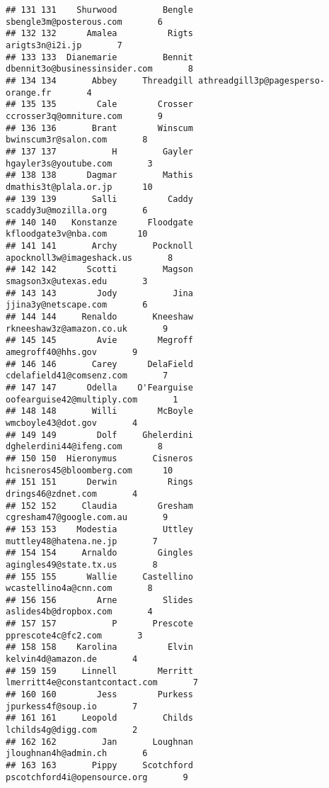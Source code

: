 \documentclass[]{article}
\begin{document}
\begin{verbatim}
## 131 131    Shurwood         Bengle            sbengle3m@posterous.com       6
## 132 132      Amalea          Rigts                    arigts3n@i2i.jp       7
## 133 133  Dianemarie         Bennit      dbennit3o@businessinsider.com       8
## 134 134       Abbey     Threadgill athreadgill3p@pagesperso-orange.fr       4
## 135 135        Cale        Crosser            ccrosser3q@omniture.com       9
## 136 136       Brant        Winscum               bwinscum3r@salon.com       8
## 137 137           H         Gayler              hgayler3s@youtube.com       3
## 138 138      Dagmar         Mathis              dmathis3t@plala.or.jp      10
## 139 139       Salli          Caddy               scaddy3u@mozilla.org       6
## 140 140   Konstanze      Floodgate               kfloodgate3v@nba.com      10
## 141 141       Archy       Pocknoll          apocknoll3w@imageshack.us       8
## 142 142      Scotti         Magson               smagson3x@utexas.edu       3
## 143 143        Jody           Jina               jjina3y@netscape.com       6
## 144 144     Renaldo       Kneeshaw           rkneeshaw3z@amazon.co.uk       9
## 145 145        Avie        Megroff                 amegroff40@hhs.gov       9
## 146 146       Carey      DelaField           cdelafield41@comsenz.com       7
## 147 147      Odella    O'Fearguise         oofearguise42@multiply.com       1
## 148 148       Willi        McBoyle                 wmcboyle43@dot.gov       4
## 149 149        Dolf     Ghelerdini            dghelerdini44@ifeng.com       8
## 150 150  Hieronymus       Cisneros          hcisneros45@bloomberg.com      10
## 151 151      Derwin          Rings                 drings46@zdnet.com       4
## 152 152     Claudia        Gresham           cgresham47@google.com.au       9
## 153 153    Modestia         Uttley             muttley48@hatena.ne.jp       7
## 154 154     Arnaldo        Gingles             agingles49@state.tx.us       8
## 155 155      Wallie     Castellino              wcastellino4a@cnn.com       8
## 156 156        Arne         Slides              aslides4b@dropbox.com       4
## 157 157           P       Prescote                pprescote4c@fc2.com       3
## 158 158    Karolina          Elvin                 kelvin4d@amazon.de       4
## 159 159     Linnell        Merritt     lmerritt4e@constantcontact.com       7
## 160 160        Jess        Purkess                 jpurkess4f@soup.io       7
## 161 161     Leopold         Childs                 lchilds4g@digg.com       2
## 162 162         Jan       Loughnan               jloughnan4h@admin.ch       6
## 163 163       Pippy     Scotchford       pscotchford4i@opensource.org       9

\end{verbatim}
\end{document}
